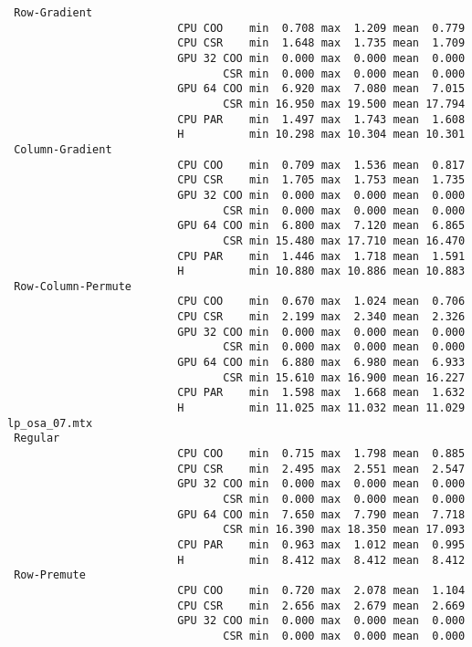 \begin{verbatim}
 Row-Gradient
                          CPU COO    min  0.708 max  1.209 mean  0.779
                          CPU CSR    min  1.648 max  1.735 mean  1.709
                          GPU 32 COO min  0.000 max  0.000 mean  0.000
                                 CSR min  0.000 max  0.000 mean  0.000
                          GPU 64 COO min  6.920 max  7.080 mean  7.015
                                 CSR min 16.950 max 19.500 mean 17.794
                          CPU PAR    min  1.497 max  1.743 mean  1.608
                          H          min 10.298 max 10.304 mean 10.301
 Column-Gradient
                          CPU COO    min  0.709 max  1.536 mean  0.817
                          CPU CSR    min  1.705 max  1.753 mean  1.735
                          GPU 32 COO min  0.000 max  0.000 mean  0.000
                                 CSR min  0.000 max  0.000 mean  0.000
                          GPU 64 COO min  6.800 max  7.120 mean  6.865
                                 CSR min 15.480 max 17.710 mean 16.470
                          CPU PAR    min  1.446 max  1.718 mean  1.591
                          H          min 10.880 max 10.886 mean 10.883
 Row-Column-Permute
                          CPU COO    min  0.670 max  1.024 mean  0.706
                          CPU CSR    min  2.199 max  2.340 mean  2.326
                          GPU 32 COO min  0.000 max  0.000 mean  0.000
                                 CSR min  0.000 max  0.000 mean  0.000
                          GPU 64 COO min  6.880 max  6.980 mean  6.933
                                 CSR min 15.610 max 16.900 mean 16.227
                          CPU PAR    min  1.598 max  1.668 mean  1.632
                          H          min 11.025 max 11.032 mean 11.029
lp_osa_07.mtx
 Regular
                          CPU COO    min  0.715 max  1.798 mean  0.885
                          CPU CSR    min  2.495 max  2.551 mean  2.547
                          GPU 32 COO min  0.000 max  0.000 mean  0.000
                                 CSR min  0.000 max  0.000 mean  0.000
                          GPU 64 COO min  7.650 max  7.790 mean  7.718
                                 CSR min 16.390 max 18.350 mean 17.093
                          CPU PAR    min  0.963 max  1.012 mean  0.995
                          H          min  8.412 max  8.412 mean  8.412
 Row-Premute
                          CPU COO    min  0.720 max  2.078 mean  1.104
                          CPU CSR    min  2.656 max  2.679 mean  2.669
                          GPU 32 COO min  0.000 max  0.000 mean  0.000
                                 CSR min  0.000 max  0.000 mean  0.000

\end{verbatim}
